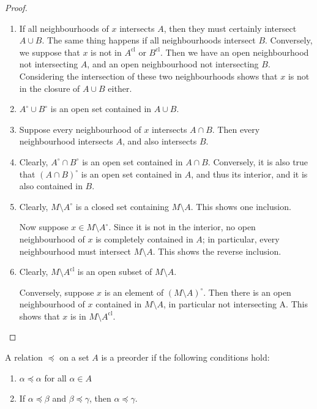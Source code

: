 \documentclass[prb,12pt]{revtex4-2}
\theoremstyle{definition}
\theoremstyle{definition}
\theoremstyle{definition}
\newenvironment{parts}{\begin{enumerate}[label=(\alph*)]}{\end{enumerate}}
\begin{document}
\begin{proof}
	\begin{parts}
		\item If all neighbourhoods of $x$ intersects $A$, then they must certainly intersect $A\cup B$. The same thing happens if all neighbourhoods intersect $B$. Conversely, we suppose that $x$ is not in $A^\text{cl}$ or $B^\text{cl}$. Then we have an open neighbourhood not intersecting $A$, and an open neighbourhood not intersecting $B$. Considering the intersection of these two neighbourhoods shows that $x$ is not in the closure of $A\cup B$ either.
		\item $A^\circ\cup B^\circ$ is an open set contained in $A\cup B$.
		\item Suppose every neighbourhood of $x$ intersects $A\cap B$. Then every neighbourhood intersects $A$, and also intersects $B$.
		\item Clearly, $A^\circ \cap B^\circ$ is an open set contained in $A\cap B$. Conversely, it is also true that $(A\cap B)^\circ$ is an open set contained in $A$, and thus its interior, and it is also contained in $B$.
		\item Clearly, $M \setminus A^\circ$ is a closed set containing $M\setminus A$. This shows one inclusion.
		
		Now suppose $x\in M \setminus A^\circ$. Since it is not in the interior, no open neighbourhood of $x$ is completely contained in $A$; in particular, every neighbourhood must intersect $M\setminus A$. This shows the reverse inclusion.
		\item Clearly, $M\setminus A^\text{cl}$ is an open subset of $M \setminus A$.
		
		Conversely, suppose $x$ is an element of $(M \setminus A)^\circ$. Then there is an open neighbourhood of $x$ contained in $M \setminus A$, in particular not intersecting A. This shows that $x$ is in $M \setminus A^\text{cl}$.\qedhere
	\end{parts}
\end{proof}
\begin{Definition}[Preorder]
	A relation $\preceq$ on a set $A$ is a preorder if the following conditions hold:
	\begin{parts}
		\item $\alpha \preceq \alpha$ for all $\alpha\in A$
		\item If $\alpha\preceq \beta$ and $\beta\preceq\gamma$, then $\alpha\preceq\gamma$.
	\end{parts}
\end{Definition}
\end{document}
